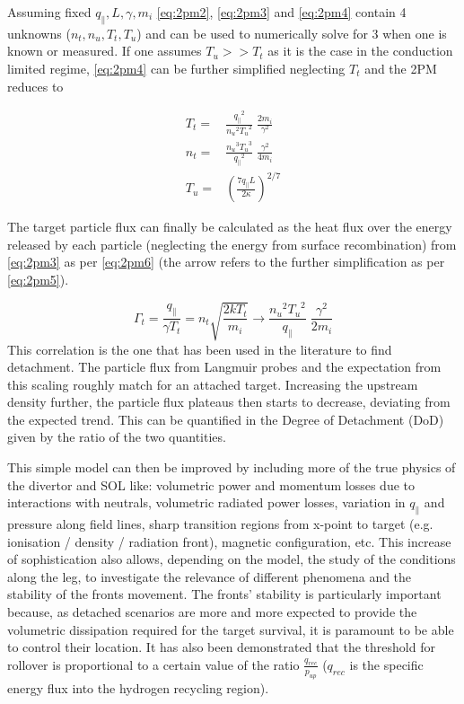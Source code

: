 Assuming fixed $q_{\parallel}, L, \gamma, m_i$ \autoref{eq:2pm2}, \ref{eq:2pm3} and \ref{eq:2pm4} contain 4 unknowns ($n_t, n_u, T_t, T_u$) and can be used to numerically solve for 3 when one is known or measured. If one assumes $T_u >> T_t$ as it is the case in the conduction limited regime, \autoref{eq:2pm4} can be further simplified neglecting $T_t$ and the 2PM reduces to

\begin{equation}
\begin{aligned}
T_t =& \frac{{q_{\parallel}}^2}{{n_u}^2 {T_u}^2} \; \frac{2m_i}{\gamma^2} \\
n_t =& \frac{{n_u}^3 {T_u}^3}{{q_{\parallel}}^2} \; \frac{\gamma^2}{4m_i} \\
T_u =& \left( \frac{7 q_{\parallel} L}{2 \kappa} \right)^{2/7}
\end{aligned}
\label{eq:2pm5}
\end{equation}

The target particle flux can finally be calculated as the heat flux over the energy released by each particle (neglecting the energy from surface recombination) from \autoref{eq:2pm3} as per \autoref{eq:2pm6} (the arrow refers to the further simplification as per \autoref{eq:2pm5}).

\begin{equation}
\Gamma_t = \frac{q_{\parallel}}{\gamma T_t} =  n_t \sqrt{\frac{2kT_t}{m_i}} \rightarrow \frac{{n_u}^2 {T_u}^2}{q_{\parallel}} \; \frac{\gamma^2}{2m_i}
\label{eq:2pm6}
\end{equation}
This correlation is the one that has been used in the literature to find detachment. The particle flux from Langmuir probes and the expectation from this scaling roughly match for an attached target. Increasing the upstream density further, the particle flux plateaus then starts to decrease, deviating from the expected trend. This can be quantified in the Degree of Detachment (DoD) given by the ratio of the two quantities.\cite{Stangeby2001,Loarte1998}

This simple model can then be improved by including more of the true physics of the divertor and SOL like: volumetric power and momentum losses due to interactions with neutrals, volumetric radiated power losses, variation in $q_{\parallel}$ and pressure along field lines, sharp transition regions from x-point to target (e.g. ionisation / density / radiation front), magnetic configuration, etc.\cite{Stangeby2001,Cowley2022,Reinke2017,Lipschultz2016} This increase of sophistication also allows, depending on the model, the study of the conditions along the leg, to investigate the relevance of different phenomena and the stability of the fronts movement. The fronts' stability is particularly important because, as detached scenarios are more and more expected to provide the volumetric dissipation required for the target survival, it is paramount to be able to control their location. It has also been demonstrated that the threshold for rollover is proportional to a certain value of the ratio $ \frac {q_{rec}} {p_{up}}$ ($q_{rec}$ is the speciﬁc energy ﬂux into the hydrogen recycling region). \cite{Krasheninnikov1999,Krasheninnikov2016,Stangeby2018}

